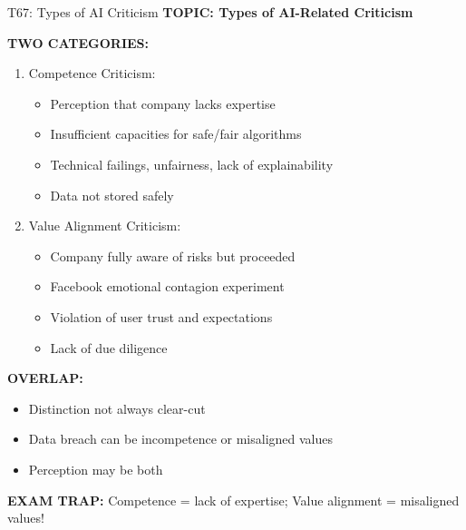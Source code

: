 \documentclass[8pt]{beamer}
\begin{document}
	\begin{frame}{T67: Types of AI Criticism}
		\fontsize{6.5}{7.5}\selectfont
		\textbf{TOPIC: Types of AI-Related Criticism}
		
		\vspace{0.1cm}
		\textbf{TWO CATEGORIES:}
		
		\begin{enumerate}
			\item \textcolor{myblue}{Competence Criticism:}
			\begin{itemize}
				\item Perception that company lacks expertise
				\item Insufficient capacities for safe/fair algorithms
				\item Technical failings, unfairness, lack of explainability
				\item Data not stored safely
			\end{itemize}
			
			\item \textcolor{myblue}{Value Alignment Criticism:}
			\begin{itemize}
				\item Company fully aware of risks but proceeded
				\item Facebook emotional contagion experiment
				\item Violation of user trust and expectations
				\item Lack of due diligence
			\end{itemize}
		\end{enumerate}
		
		\vspace{0.1cm}
		\textbf{OVERLAP:}
		\begin{itemize}
			\item Distinction not always clear-cut
			\item Data breach can be incompetence or misaligned values
			\item Perception may be both
		\end{itemize}
		
		\textcolor{myred}{\textbf{EXAM TRAP:}} Competence = \textcolor{myblue}{lack of expertise}; Value alignment = \textcolor{myblue}{misaligned values}!
	\end{frame}
	
\end{document}
